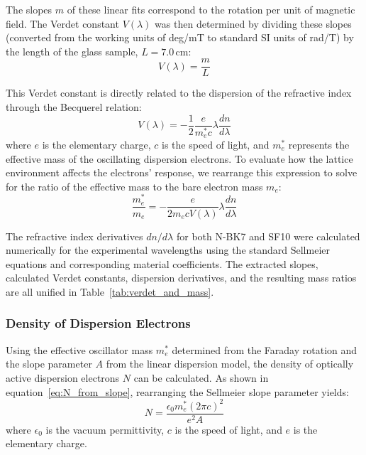 \documentclass[a4paper]{article}
\begin{document}
The slopes $m$ of these linear fits correspond to the rotation per unit of magnetic field. The Verdet constant $V(\lambda)$ was then determined by dividing these slopes (converted from the working units of deg/mT to standard SI units of rad/T) by the length of the glass sample, $L = 7.0\,\mathrm{cm}$:
\begin{equation}
  V(\lambda) = \frac{m}{L}
\end{equation}

This Verdet constant is directly related to the dispersion of the refractive index through the Becquerel relation:
\begin{equation}
  V(\lambda) = -\frac{1}{2}\frac{e}{m_{e}^{*}c}\lambda\frac{dn}{d\lambda}
\end{equation}
where $e$ is the elementary charge, $c$ is the speed of light, and $m_{e}^*$ represents the effective mass of the oscillating dispersion electrons. To evaluate how the lattice environment affects the electrons' response, we rearrange this expression to solve for the ratio of the effective mass to the bare electron mass $m_e$:
\begin{equation}
  \frac{m_{e}^*}{m_{e}} = -\frac{e}{2 m_{e} c V(\lambda)} \lambda \frac{dn}{d\lambda}
\end{equation}

The refractive index derivatives $dn/d\lambda$ for both N-BK7 and SF10 were calculated numerically for the experimental wavelengths using the standard Sellmeier equations and corresponding material coefficients. The extracted slopes, calculated Verdet constants, dispersion derivatives, and the resulting mass ratios are all unified in Table~\ref{tab:verdet_and_mass}.

\subsubsection{Density of Dispersion Electrons}

Using the effective oscillator mass $m_e^*$ determined from the Faraday rotation and the slope parameter $A$ from the linear dispersion model, the density of optically active dispersion electrons $N$ can be calculated. As shown in equation~\ref{eq:N_from_slope}, rearranging the Sellmeier slope parameter yields:
\begin{equation}
  N = \frac{\epsilon_0 m_e^* (2\pi c)^2}{e^2 A}
\end{equation}
where $\epsilon_0$ is the vacuum permittivity, $c$ is the speed of light, and $e$ is the elementary charge.
\end{document}

